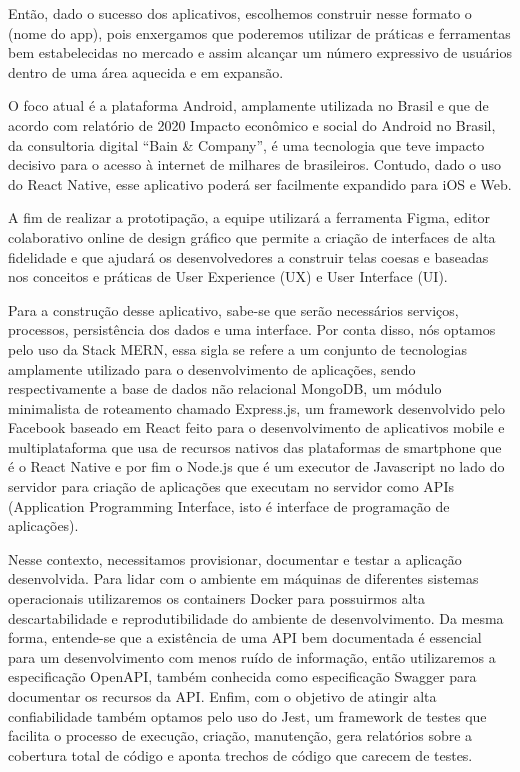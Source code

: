 \begin{apendicesenv}
	Então, dado o sucesso dos aplicativos, escolhemos construir nesse formato o (nome do app), pois enxergamos que poderemos utilizar de práticas e ferramentas bem estabelecidas no mercado e assim alcançar um número expressivo de usuários dentro de uma área aquecida e em expansão.
	
	O foco atual é a plataforma Android, amplamente utilizada no Brasil e que de acordo com relatório de 2020 Impacto econômico e social do Android no Brasil, da consultoria digital “Bain & Company”, é uma tecnologia que teve impacto decisivo para o acesso à internet de milhares de brasileiros. Contudo, dado o uso do React Native, esse aplicativo poderá ser facilmente expandido para iOS e Web.
	
	A fim de realizar a prototipação, a equipe utilizará a ferramenta Figma, editor colaborativo online de design gráfico que permite a criação de interfaces de alta fidelidade e que ajudará os desenvolvedores a construir telas coesas e baseadas nos conceitos e práticas de User Experience (UX) e User Interface (UI).
	
	Para a construção desse aplicativo, sabe-se que serão necessários serviços, processos, persistência dos dados e uma interface. Por conta disso, nós optamos pelo uso da Stack MERN, essa sigla se refere a um conjunto de tecnologias amplamente utilizado para o desenvolvimento de aplicações, sendo respectivamente a base de dados não relacional MongoDB, um módulo minimalista de roteamento chamado Express.js, um framework desenvolvido pelo Facebook baseado em React feito para o desenvolvimento de aplicativos mobile e multiplataforma que usa de recursos nativos das plataformas de smartphone que é o React Native e por fim o Node.js que é um executor de Javascript no lado do servidor para criação de aplicações que executam no servidor como APIs (Application Programming Interface, isto é interface de programação de aplicações).
	
	Nesse contexto, necessitamos provisionar, documentar e testar a aplicação desenvolvida. Para lidar com o ambiente em máquinas de diferentes sistemas operacionais utilizaremos os containers Docker para possuirmos alta descartabilidade e reprodutibilidade do ambiente de desenvolvimento. Da mesma forma, entende-se que a existência de uma API bem documentada é essencial para um desenvolvimento com menos ruído de informação, então utilizaremos a especificação OpenAPI, também conhecida como especificação Swagger para documentar os recursos da API. Enfim, com o objetivo de atingir alta confiabilidade também optamos pelo uso do Jest, um framework de testes que facilita o processo de execução, criação, manutenção, gera relatórios sobre a cobertura total de código e aponta trechos de código que carecem de testes.
	

\end{apendicesenv}
